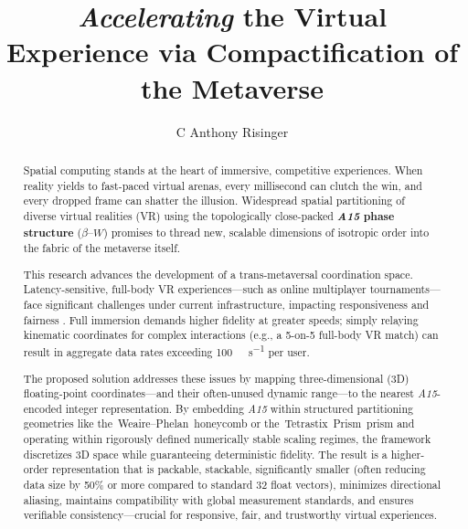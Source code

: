 \documentclass[10pt]{article}
\def\AAAB{\textit{A15}}
\def\betaW{$\beta$--$W$}
\def\WP{Weaire--Phelan}
\def\TSP{Tetrastix~Prism}
\def\tWPh{the~\WP{}~honeycomb}
\def\tTSp{the~\TSP{}~prism}
\def\IL{Infima~Labs}
\begin{document}

\begin{opening}


    \author[%
        \IL{}, \URL{https://infima.space}, e-mail: \URL{anthony@infima.space}\\
        Snap Game Services, \URL{https://snap.gs}, e-mail: \URL{anthony@snap.gs}
    ]{C Anthony Risinger}


    \title{%
        \emph{Accelerating} {\normalsize the} Virtual Experience\newline{}
        {\normalsize via} Compactification {\normalsize of the} Metaverse
    }


    \begin{abstract}
        \setlength{\parindent}{0em}
        \setlength{\parskip}{1em}

        Spatial computing stands at the heart of immersive, competitive experiences. When reality yields to fast-paced virtual arenas, every millisecond can clutch the win, and every dropped frame can shatter the illusion. Widespread spatial partitioning of diverse virtual realities (VR) using the topologically close-packed \textbf{\AAAB{} phase structure} (\betaW{}) promises to thread new, scalable dimensions of isotropic order into the fabric of the metaverse itself.

        This research advances the development of a trans-metaversal coordination space. Latency-sensitive, full-body VR experiences---such as online multiplayer tournaments---face significant challenges under current infrastructure, impacting responsiveness and fairness \cite{Claypool2006}. Full immersion demands higher fidelity at greater speeds; simply relaying kinematic coordinates for complex interactions (e.g., a 5-on-5 full-body VR match) can result in aggregate data rates exceeding \SI{100}{\kilo\bit\per\second} per user.

        The proposed solution addresses these issues by mapping three-dimensional (3D) floating-point coordinates---and their often-unused dynamic range---to the nearest \AAAB{}-encoded integer representation. By embedding \AAAB{} within structured partitioning geometries like \tWPh{} or \tTSp{} and operating within rigorously defined numerically stable scaling regimes, the framework discretizes 3D space while guaranteeing deterministic fidelity. The result is a higher-order representation that is packable, stackable, significantly smaller (often reducing data size by 50\% or more compared to standard \SI{32}{\bit} float vectors), minimizes directional aliasing, maintains compatibility with global measurement standards, and ensures verifiable consistency---crucial for responsive, fair, and trustworthy virtual experiences.


\end{abstract}
\end{opening}
\end{document}
